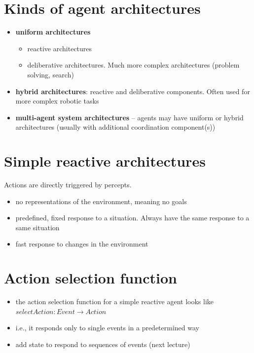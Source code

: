\documentclass{article}
\begin{document}
\tableofcontents

\newpage

\section{Kinds of agent architectures}
\begin{itemize}
  \item \textbf{uniform architectures}
  \begin{itemize}
    \item reactive architectures 
    \item deliberative architectures. Much more complex architectures (problem solving, search)
  \end{itemize}
  \item \textbf{hybrid architectures}: reactive and deliberative components. Often used for more complex robotic tasks 
  \item \textbf{multi-agent system architectures} – agents may have uniform or hybrid architectures (usually with additional coordination component(s))
\end{itemize}

\section{Simple reactive architectures}

\begin{flushleft}
Actions are directly triggered by percepts.
\begin{itemize}
  \item no representations of the environment, meaning no goals
  \item predefined, fixed response to a situation. Always have the same response to a same situation
  \item fast response to changes in the environment
\end{itemize}
\end{flushleft}

\section{Action selection function}

\begin{itemize}
  \item the action selection function for a simple reactive agent looks like $selectAction : Event \rightarrow Action$
  \item i.e., it responds only to single events in a predetermined way 
  \item add state to respond to sequences of events (next lecture)
\end{itemize}
\end{document}
